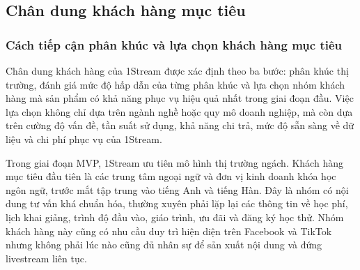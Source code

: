 \subsection{Chân dung khách hàng mục tiêu}

\subsubsection{Cách tiếp cận phân khúc và lựa chọn khách hàng mục tiêu}

Chân dung khách hàng của 1Stream được xác định theo ba bước: phân khúc thị
trường, đánh giá mức độ hấp dẫn của từng phân khúc và lựa chọn nhóm khách hàng
mà sản phẩm có khả năng phục vụ hiệu quả nhất trong giai đoạn đầu. Việc lựa chọn
không chỉ dựa trên ngành nghề hoặc quy mô doanh nghiệp, mà còn dựa trên cường độ
vấn đề, tần suất sử dụng, khả năng chi trả, mức độ sẵn sàng về dữ liệu và chi phí
phục vụ của 1Stream.

Trong giai đoạn MVP, 1Stream ưu tiên mô hình thị trường ngách. Khách hàng mục
tiêu đầu tiên là các trung tâm ngoại ngữ và đơn vị kinh doanh khóa học ngôn ngữ,
trước mắt tập trung vào tiếng Anh và tiếng Hàn. Đây là nhóm có nội dung tư vấn
khá chuẩn hóa, thường xuyên phải lặp lại các thông tin về học phí, lịch khai
giảng, trình độ đầu vào, giáo trình, ưu đãi và đăng ký học thử. Nhóm khách hàng
này cũng có nhu cầu duy trì hiện diện trên Facebook và TikTok nhưng không phải
lúc nào cũng đủ nhân sự để sản xuất nội dung và đứng livestream liên tục.

